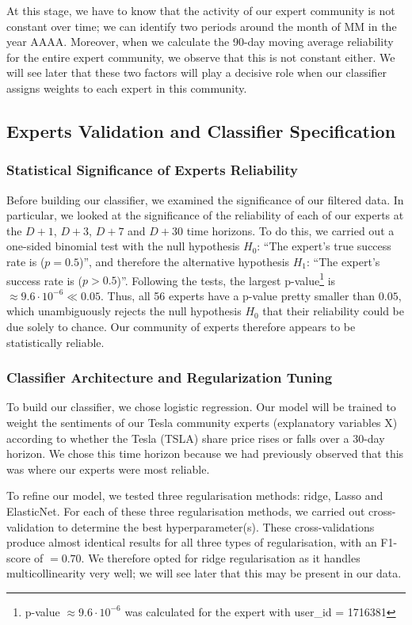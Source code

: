 \documentclass{article}
\begin{document}
At this stage, we have to know that the activity of our expert community is not constant over time; we can identify two periods around the month of MM in the year AAAA. Moreover, when we calculate the 90-day moving average reliability for the entire expert community, we observe that this is not constant either. We will see later that these two factors will play a decisive role when our classifier assigns weights to each expert in this community.

\subsection{Experts Validation and Classifier Specification}

\subsubsection{Statistical Significance of Experts Reliability}
Before building our classifier, we examined the significance of our filtered data. In particular, we looked at the significance of the reliability of each of our experts at the $D+1$, $D+3$, $D+7$ and $D+30$ time horizons. To do this, we carried out a one-sided binomial test with the null hypothesis $H_0$: “The expert’s true success rate is ($p = 0.5$)”, and therefore the alternative hypothesis $H_1$: “The expert’s success rate is ($p > 0.5$)”. Following the tests, the largest p-value\footnote{p-value $\approx 9.6 \cdot 10^{-6}$ was calculated for the expert with user\_id = 1716381} is $\approx 9.6 \cdot 10^{-6}\ll 0.05$. Thus, all 56 experts have a p-value pretty smaller than $0.05$, which unambiguously rejects the null hypothesis $H_0$ that their reliability could be due solely to chance. Our community of experts therefore appears to be statistically reliable.

\subsubsection{Classifier Architecture and Regularization Tuning}
To build our classifier, we chose logistic regression. Our model will be trained to weight the sentiments of our Tesla community experts (explanatory variables X) according to whether the Tesla (TSLA) share price rises or falls over a 30-day horizon. We chose this time horizon because we had previously observed that this was where our experts were most reliable.

To refine our model, we tested three regularisation methods: ridge, Lasso and ElasticNet. For each of these three regularisation methods, we carried out cross-validation to determine the best hyperparameter(s). These cross-validations produce almost identical results for all three types of regularisation, with an F1-score of $= 0.70$. We therefore opted for ridge regularisation as it handles multicollinearity very well; we will see later that this may be present in our data.
\end{document}
